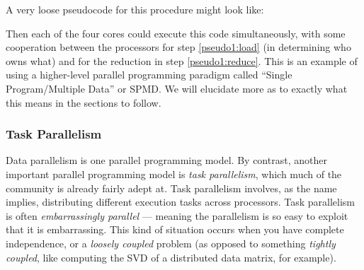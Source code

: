 A very loose pseudocode for this procedure might look like:


Then each of the four cores could execute this code simultaneously, with some cooperation between the processors for step \ref{pseudo1:load} (in determining who owns what) and for the reduction in step \ref{pseudo1:reduce}.  This is an example of using a higher-level parallel programming paradigm called ``Single Program/Multiple Data'' or SPMD.  We will elucidate more as to exactly what this means in the sections to follow.



\subsubsection{Task Parallelism}

Data parallelism is one parallel programming model.  By contrast, another important parallel programming model is \emph{task parallelism}, which much of the  community is already fairly adept at.  Task parallelism involves, as the name implies, distributing different execution tasks across processors.  Task parallelism is often \emph{embarrassingly parallel} --- meaning the parallelism is so easy to exploit that it is embarrassing.  This kind of situation occurs when you have complete independence, or a \emph{loosely coupled} problem (as opposed to something \emph{tightly coupled}, like computing the SVD of a distributed data matrix, for example).  

